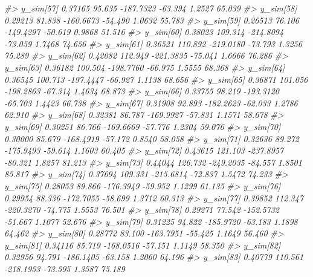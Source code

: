 \documentclass[
  10pt,
  italian,
  a4paper,
  extrafontsizes,onecolumn,openright
  ]{memoir}
\newenvironment{Shaded}{\begin{snugshade}}{\end{snugshade}}
\newcommand{\CommentTok}[1]{\textcolor[rgb]{0.56,0.35,0.01}{\textit{#1}}}
\begin{document}
\begin{Shaded}
\begin{Highlighting}[]
\CommentTok{\#\textgreater{}   y\_sim[57]   0.37165  95.635 {-}187.7323 {-}63.394  1.2527 65.039}
\CommentTok{\#\textgreater{}   y\_sim[58]   0.29213  81.838 {-}160.6673 {-}54.490  1.0632 55.783}
\CommentTok{\#\textgreater{}   y\_sim[59]   0.26513  76.106 {-}149.4297 {-}50.619  0.9868 51.516}
\CommentTok{\#\textgreater{}   y\_sim[60]   0.38023 109.314 {-}214.8094 {-}73.059  1.7468 74.656}
\CommentTok{\#\textgreater{}   y\_sim[61]   0.36521 110.892 {-}219.0180 {-}73.793  1.3256 75.289}
\CommentTok{\#\textgreater{}   y\_sim[62]   0.42082 112.949 {-}221.3835 {-}75.041  1.6666 76.286}
\CommentTok{\#\textgreater{}   y\_sim[63]   0.36182 100.504 {-}198.7760 {-}66.975  1.5555 68.368}
\CommentTok{\#\textgreater{}   y\_sim[64]   0.36545 100.713 {-}197.4447 {-}66.927  1.1138 68.656}
\CommentTok{\#\textgreater{}   y\_sim[65]   0.36871 101.056 {-}198.2863 {-}67.314  1.4634 68.873}
\CommentTok{\#\textgreater{}   y\_sim[66]   0.33755  98.219 {-}193.3120 {-}65.703  1.4423 66.738}
\CommentTok{\#\textgreater{}   y\_sim[67]   0.31908  92.893 {-}182.2623 {-}62.033  1.2786 62.910}
\CommentTok{\#\textgreater{}   y\_sim[68]   0.32381  86.787 {-}169.9927 {-}57.831  1.1571 58.678}
\CommentTok{\#\textgreater{}   y\_sim[69]   0.30251  86.766 {-}169.6669 {-}57.776  1.2304 59.076}
\CommentTok{\#\textgreater{}   y\_sim[70]   0.30000  85.679 {-}168.4919 {-}57.172  0.8540 58.058}
\CommentTok{\#\textgreater{}   y\_sim[71]   0.32636  89.272 {-}175.9493 {-}59.614  1.1603 60.405}
\CommentTok{\#\textgreater{}   y\_sim[72]   0.43615 121.103 {-}237.8957 {-}80.321  1.8257 81.213}
\CommentTok{\#\textgreater{}   y\_sim[73]   0.44044 126.732 {-}249.2035 {-}84.557  1.8501 85.817}
\CommentTok{\#\textgreater{}   y\_sim[74]   0.37694 109.331 {-}215.6814 {-}72.837  1.5472 74.233}
\CommentTok{\#\textgreater{}   y\_sim[75]   0.28053  89.866 {-}176.3949 {-}59.952  1.1299 61.135}
\CommentTok{\#\textgreater{}   y\_sim[76]   0.29954  88.336 {-}172.7055 {-}58.699  1.3712 60.313}
\CommentTok{\#\textgreater{}   y\_sim[77]   0.39852 112.347 {-}220.3270 {-}74.775  1.5553 76.501}
\CommentTok{\#\textgreater{}   y\_sim[78]   0.29271  77.542 {-}152.5732 {-}51.667  1.1077 52.676}
\CommentTok{\#\textgreater{}   y\_sim[79]   0.31225  94.822 {-}185.9720 {-}63.183  1.1898 64.462}
\CommentTok{\#\textgreater{}   y\_sim[80]   0.28772  83.100 {-}163.7951 {-}55.425  1.1649 56.460}
\CommentTok{\#\textgreater{}   y\_sim[81]   0.34116  85.719 {-}168.0516 {-}57.151  1.1149 58.350}
\CommentTok{\#\textgreater{}   y\_sim[82]   0.32956  94.791 {-}186.1405 {-}63.158  1.2060 64.196}
\CommentTok{\#\textgreater{}   y\_sim[83]   0.40779 110.561 {-}218.1953 {-}73.595  1.3587 75.189}

\end{Highlighting}
\end{Shaded}
\end{document}
